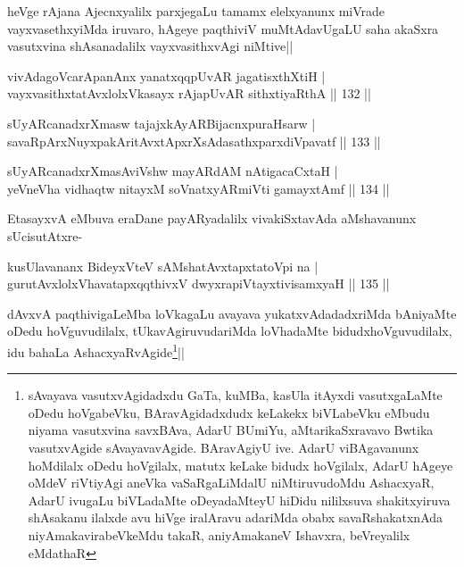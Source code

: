 \begin{artha}
heVge rAjana Ajecnxyalilx parxjegaLu tamamx elelxyanunx miVrade vayxvasethxyiMda iruvaro, hAgeye paqthiviV muMtAdavUgaLU saha akaSxra vasutxvina shAsanadalilx vayxvasithxvAgi niMtive||
\end{artha}


\begin{shl}
vivAdagoVcarApanAnx yanatxqqpUvAR jagatisxthXtiH |\\
vayxvasithxtatAvxlolxVkasayx rAjapUvAR sithxtiyaRthA \hfill || 132 ||
\end{shl}

\begin{shl}
sUyARcanadxrXmasw tajajxkAyARBijacnxpuraHsarw |\\
savaRpArxNuyxpakAritAvxtApxrXsAdasathxparxdiVpavatf \hfill || 133 ||
\end{shl}

\begin{shl}
sUyARcanadxrXmasAviVshw mayARdAM nAtigacaCxtaH |\\
yeVneVha vidhaqtw nitayxM soV\s natxyARmiVti gamayxtAmf \hfill || 134 ||
\end{shl}

\begin{artha}
EtasayxvA eMbuva eraDane payARyadalilx vivakiSxtavAda aMshavanunx sUcisutAtxre-
\end{artha}

\begin{shl}
kusUlavananx BideyxVteV sAMshatAvxtapxtatoV\s pi na |\\
gurutAvxlolxVhavatapxqqthivxV dwyxrapiVtayxtivisamxyaH \hfill || 135 ||
\end{shl}

\begin{artha}%
dAvxvA paqthivigaLeMba loVkagaLu avayava yukatxvAdadadxriMda bAniyaMte oDedu hoVguvudilalx, tUkavAgiruvudariMda loVhadaMte bidudxhoVguvudilalx, idu bahaLa AshacxyaRvAgide\footnote[1]{sAvayava vasutxvAgidadxdu GaTa, kuMBa, kasUla itAyxdi vasutxgaLaMte oDedu hoVgabeVku, BAravAgidadxdudx keLakekx biVLabeVku eMbudu niyama vasutxvina savxBAva, AdarU BUmiYu, aMtarikaSxravavo Bwtika vasutxvAgide sAvayavavAgide. BAravAgiyU ive. AdarU viBAgavanunx hoMdilalx oDedu hoVgilalx, matutx keLake bidudx hoVgilalx, AdarU hAgeye oMdeV riVtiyAgi aneVka vaSaRgaLiMdalU niMtiruvudoMdu AshacxyaR, AdarU ivugaLu biVLadaMte oDeyadaMteyU hiDidu nililxsuva shakitxyiruva shAsakanu ilalxde avu hiVge iralAravu adariMda obabx savaRshakatxnAda niyAmakavirabeVkeMdu takaR, aniyAmakaneV Ishavxra, beVreyalilx eMdathaR}||
\end{artha}

